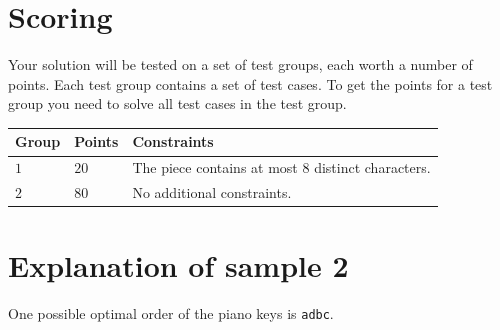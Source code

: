 \section*{Scoring}
Your solution will be tested on a set of test groups, each worth a number of points. Each test group contains
a set of test cases. To get the points for a test group you need to solve all test cases in the test group.

\noindent
\begin{tabular}{| l | l | p{12cm} |}
  \hline
  \textbf{Group} & \textbf{Points} & \textbf{Constraints} \\ \hline
  $1$    & $20$       & The piece contains at most $8$ distinct characters. \\ \hline
  $2$    & $80$       & No additional constraints. \\ \hline
\end{tabular}

\section*{Explanation of sample 2}

One possible optimal order of the piano keys is \texttt{adbc}.

